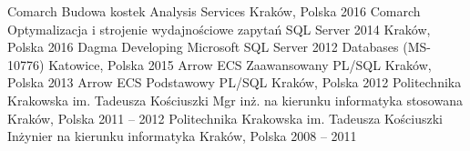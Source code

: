 \begin{cventries}
	\cventry
		{Comarch}
		{Budowa kostek Analysis Services}
		{Kraków, Polska}
		{2016}
		{}
	\cventry
		{Comarch}
		{Optymalizacja i strojenie wydajnościowe zapytań SQL Server 2014}
		{Kraków, Polska}
		{2016}
		{}
	\cventry
		{Dagma}
		{Developing Microsoft SQL Server 2012 Databases (MS-10776)}
		{Katowice, Polska}
		{2015}
		{}
	\cventry
		{Arrow ECS}
		{Zaawansowany PL/SQL}
		{Kraków, Polska}
		{2013}
		{}
	\cventry
		{Arrow ECS}
		{Podstawowy PL/SQL}
		{Kraków, Polska}
		{2012}
		{}
	\cventry
		{Politechnika Krakowska im. Tadeusza Kościuszki}
		{Mgr inż. na kierunku informatyka stosowana}
		{Kraków, Polska} 
		{2011 -- 2012}
		{}
	\cventry
		{Politechnika Krakowska im. Tadeusza Kościuszki}
		{Inżynier na kierunku informatyka}
		{Kraków, Polska}
		{2008 -- 2011} 
		{}
\end{cventries}
